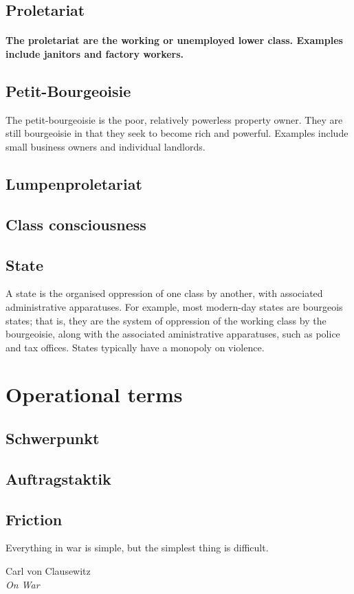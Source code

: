     \subsection{Proletariat}
      \paragraph{The proletariat are the working or unemployed lower class. Examples include janitors and factory workers.}
    \subsection{Petit-Bourgeoisie}
     The petit-bourgeoisie is the poor, relatively powerless property owner. They are still bourgeoisie in that they seek to become rich and powerful. Examples include small business owners and individual landlords.
    \subsection{Lumpenproletariat}
    \subsection{Class consciousness}
    \subsection{State}
     A state is the organised oppression of one class by another, with associated administrative apparatuses. For example, most modern-day states are bourgeois states; that is, they are the system of oppression of the working class by the bourgeoisie, along with the associated aministrative apparatuses, such as police and tax offices. States typically have a monopoly on violence.
  \section{Operational terms}
    \subsection{Schwerpunkt}
    \subsection{Auftragstaktik}

    \subsection{Friction}
      \epigraph{Everything in war is simple, but the simplest thing is difficult.}{Carl von Clausewitz\\ \textit{On War}}